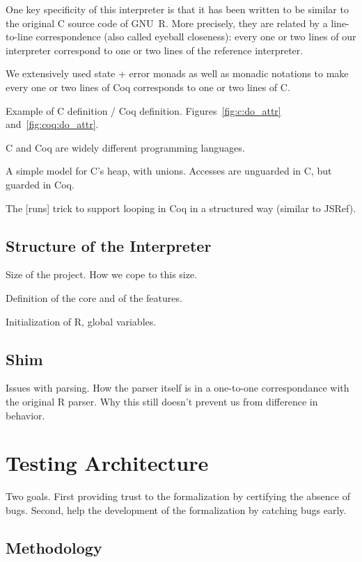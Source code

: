 \documentclass[
    sigplan,
    10pt,
    review, %
    natbib=false %
 ]{acmart}
\begin{document}
One key specificity of this interpreter is that it has been written
to be similar to the original C source code of GNU~R.
More precisely, they are related by a line-to-line correspondence
(also called eyeball closeness):
every one or two lines of our interpreter
correspond to one or two lines of the reference interpreter.

We extensively used state + error monads as well as monadic notations
to make every one or two lines of Coq corresponds to one or two lines of C.

Example of C definition / Coq definition. Figures~\ref{fig:c:do_attr} and~\ref{fig:coq:do_attr}.

C and Coq are widely different programming languages.

A simple model for C's heap, with unions.
Accesses are unguarded in C, but guarded in Coq.

The [runs] trick to support looping in Coq in a structured way (similar to JSRef).

\subsection{Structure of the Interpreter}
\label{sec:coq:structure}

Size of the project.
How we cope to this size.

Definition of the core and of the features.

Initialization of R, global variables.

\subsection{Shim}
\label{sec:shim}

Issues with parsing.
How the parser itself is in a one-to-one correspondance with the original R parser.
Why this still doesn't prevent us from difference in behavior.


\section{Testing Architecture}
\label{sec:testing:architecture}

Two goals.
First providing trust to the formalization by certifying the absence of bugs.
Second, help the development of the formalization by catching bugs early.

\subsection{Methodology}
\label{sec:test:methodology}
\end{document}

